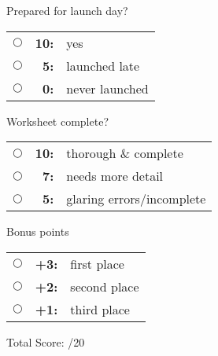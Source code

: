 \documentclass[10pt]{exam}
\begin{document}
\begin{multicols}{3}

  \small
  Prepared for launch day?
  
  \begin{tabular}{crl}
    $\bigcirc$ & \bf 10: & yes \\
    $\bigcirc$ & \bf 5: & launched late \\
    $\bigcirc$ & \bf 0: & never launched \\
  \end{tabular}

  Worksheet complete?
  
  \begin{tabular}{crl}
    $\bigcirc$ & \bf 10:& thorough \& complete \\
    $\bigcirc$ & \bf 7: & needs more detail \\
    $\bigcirc$ & \bf 5: & glaring errors/incomplete  \\
  \end{tabular}

  Bonus points
  
  \begin{tabular}{crl}
    $\bigcirc$ & \bf +3: & first place \\
    $\bigcirc$ & \bf +2: & second place \\
    $\bigcirc$ & \bf +1: & third place \\
  \end{tabular}

\end{multicols}
%
\begin{flushright}
  \small 
  Total Score:   \fillin[][5em]/20
\end{flushright}
\end{document}
